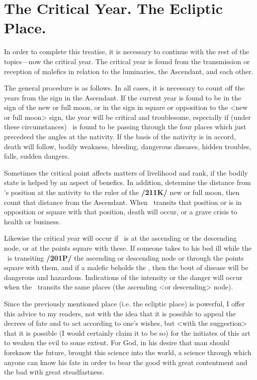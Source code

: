 \section{The Critical Year. The Ecliptic Place.}

In order to complete this treatise, it is necessary to continue with the rest of the topics—now the critical year. The critical year is found from the transmission or reception of malefics in relation to the luminaries, the Ascendant, and each other. 

The general procedure is as follows. In all cases, it is necessary
to count off the years from the sign in the Ascendant. If the current year is found to be in the sign of the new or full moon, or in the sign in square or opposition to the <new or full moon> sign, the year will be critical and troublesome, especially if (under these circumstances) \Saturn\, is found to be passing through the four places which just precedeed the angles at the nativity. If the basis of the nativity is in accord, death will follow, bodily weakness, bleeding, dangerous diseases, hidden troubles, falls, sudden dangers.

Sometimes the critical point affects matters of livelihood and rank, if the bodily state is helped by an aspect of benefics. In addition, determine the distance from \Saturn’s position at the nativity to the ruler of the \textbf{/211K/} new or full moon, then count that distance from the Ascendant. When \Saturn\, transits that position or is in opposition or square with that position, death will occur, or a grave crisis to health or business. 

Likewise the critical year will occur if \Saturn\, is at the ascending or the descending node, or at the points square with these. If someone takes to his bed ill while the \Sun\, is transiting \textbf{/201P/} the ascending or descending node or through the points square with them, and if a malefic beholds the \Sun, then the bout of disease will be dangerous and hazardous. Indications of the intensity or the danger will occur when the \Moon\, transits the same places (the ascending <or descending> node).

Since the previously mentioned place (i.e. the ecliptic place) is powerful, I offer this advice to my readers, not with the idea that it is possible to appeal the decrees of fate and to act according to one’s wishes, but <with the suggestion> that it is possible (I would certainly claim it to be so) for the initiates of this art to weaken the evil to some extent. For God, in his desire that man should foreknow the future, brought this science into the world, a science through which anyone can know his fate in order to bear the good with great contentment and the bad with great steadfastness. 

